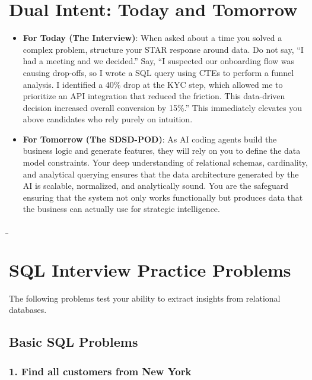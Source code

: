 \bigskip

\section{Dual Intent: Today and
Tomorrow}\label{dual-intent-today-and-tomorrow-1}

\begin{itemize}
\tightlist
\item
  \textbf{For Today (The Interview)}: When asked about a time you solved
  a complex problem, structure your STAR response around data. Do not
  say, ``I had a meeting and we decided.'' Say, ``I suspected our
  onboarding flow was causing drop-offs, so I wrote a SQL query using
  CTEs to perform a funnel analysis. I identified a 40\% drop at the KYC
  step, which allowed me to prioritize an API integration that reduced
  the friction. This data-driven decision increased overall conversion
  by 15\%.'' This immediately elevates you above candidates who rely
  purely on intuition.
\item
  \textbf{For Tomorrow (The SDSD-POD)}: As AI coding agents build the
  business logic and generate features, they will rely on you to define
  the data model constraints. Your deep understanding of relational
  schemas, cardinality, and analytical querying ensures that the data
  architecture generated by the AI is scalable, normalized, and
  analytically sound. You are the safeguard ensuring that the system not
  only works functionally but produces data that the business can
  actually use for strategic intelligence.
\end{itemize}

\b

\section{SQL Interview Practice
Problems}\label{sql-interview-practice-problems}

The following problems test your ability to extract insights from
relational databases.

\subsection{Basic SQL Problems}\label{basic-sql-problems}

\subsubsection{1. Find all customers from New
York}\label{find-all-customers-from-new-york}

